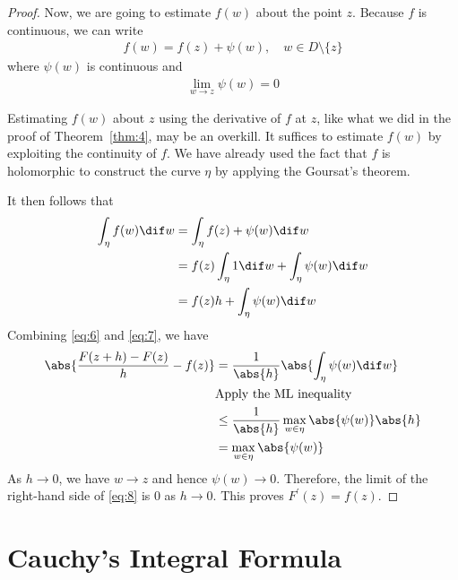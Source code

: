 \documentclass[thmcnt=section, color=cyan, 12pt]{my-elegantbook}
\begin{document}
\begin{proof}
    Now, we are going to estimate $f(w)$ about the point $z$. Because $f$ is continuous, we can write
    \begin{align*}
        f(w) = f(z) + \psi(w), \quad w \in D \setminus \{z\}
    \end{align*}
    where $\psi(w)$ is continuous and
    \begin{align*}
        \lim_{w \to z} \psi(w) = 0
    \end{align*}

    \begin{note}
        Estimating $f(w)$ about $z$ using the derivative of $f$ at $z$,
        like what we did in the proof of Theorem~\ref{thm:4}, may be an overkill.
        It suffices to estimate $f(w)$ by exploiting the continuity of $f$.
        We have already used the fact that $f$ is holomorphic to construct
        the curve $\eta$ by applying the Goursat's theorem.
    \end{note}

    It then follows that
    \begin{align}
        \int_\eta f(w) \dif w
         & = \int_\eta f(z) + \psi(w) \dif w                    \nonumber \\
         & = f(z) \int_\eta 1 \dif w + \int_\eta \psi(w) \dif w \nonumber \\
         & = f(z) h + \int_\eta \psi(w) \dif w
        \label{eq:7}
    \end{align}
    Combining \eqref{eq:6} and \eqref{eq:7}, we have
    \begin{align}
        \abs{\frac{F(z+h) - F(z)}{h} - f(z)}
         & = \frac{1}{\abs{h}} \abs{\int_\eta \psi(w) \dif w}            \nonumber  \\
         & \text{Apply the ML inequality}                                 \nonumber \\
         & \leq \frac{1}{\abs{h}} \max_{w \in \eta} \abs{\psi(w)} \abs{h} \nonumber \\
         & = \max_{w \in \eta} \abs{\psi(w)}
        \label{eq:8}
    \end{align}
    As $h \to 0$, we have $w \to z$ and hence $\psi(w) \to 0$.
    Therefore, the limit of the right-hand side of \eqref{eq:8}
    is $0$ as $h \to 0$.
    This proves $F^\prime(z) = f(z)$.
\end{proof}


\section{Cauchy's Integral Formula}
\end{document}
